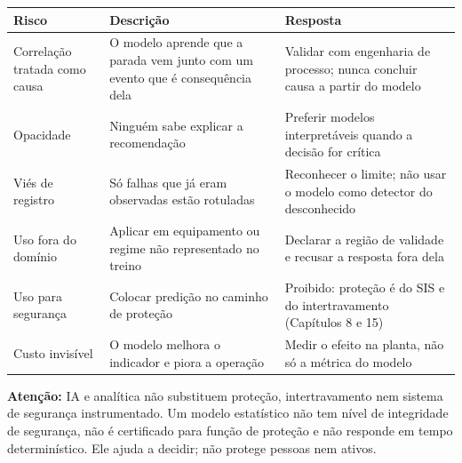 \begin{longtable}[]{@{}
  >{\raggedright\arraybackslash}p{}
  >{\raggedright\arraybackslash}p{}
  >{\raggedright\arraybackslash}p{}@{}}
\toprule\noalign{}
\begin{minipage}[b]{\linewidth}\raggedright
Risco
\end{minipage} & \begin{minipage}[b]{\linewidth}\raggedright
Descrição
\end{minipage} & \begin{minipage}[b]{\linewidth}\raggedright
Resposta
\end{minipage} \\
\midrule\noalign{}
\endhead
\bottomrule\noalign{}
\endlastfoot
Correlação tratada como causa & O modelo aprende que a parada vem junto com um evento que é consequência dela & Validar com engenharia de processo; nunca concluir causa a partir do modelo \\
Opacidade & Ninguém sabe explicar a recomendação & Preferir modelos interpretáveis quando a decisão for crítica \\
Viés de registro & Só falhas que já eram observadas estão rotuladas & Reconhecer o limite; não usar o modelo como detector do desconhecido \\
Uso fora do domínio & Aplicar em equipamento ou regime não representado no treino & Declarar a região de validade e recusar a resposta fora dela \\
Uso para segurança & Colocar predição no caminho de proteção & Proibido: proteção é do SIS e do intertravamento (Capítulos 8 e 15) \\
Custo invisível & O modelo melhora o indicador e piora a operação & Medir o efeito na planta, não só a métrica do modelo \\
\end{longtable}

\begin{caixaatencao}

\textbf{Atenção:} IA e analítica não substituem proteção, intertravamento nem sistema de segurança
instrumentado. Um modelo estatístico não tem nível de integridade de segurança, não é certificado
para função de proteção e não responde em tempo determinístico. Ele ajuda a decidir; não protege
pessoas nem ativos.

\end{caixaatencao}

